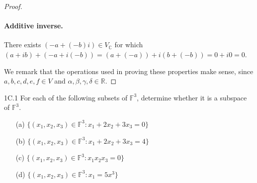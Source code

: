 \documentclass{exam}
\begin{document}
\begin{proof}
    \paragraph{Additive inverse.}
    \begin{center}
        There exists $(-a + (-b)i)\in V_{\mathbb C}$ for which $(a + ib) + (-a + i(-b)) = (a + (-a)) + i(b + (-b)) = 0 + i0 = 0.$
    \end{center}

    We remark that the operations used in proving these properties make sense, since $a, b, c, d, e, f\in V$ and $\alpha, \beta, \gamma, \delta \in \mathbb R$.
\end{proof}

\begin{problem}{1C.1}
    For each of the following subsets of $\mathbb F^3$, determine whether it is a subspace of $\mathbb F^3$.
    \begin{itemize}
        \item[(a)] $\{(x_1,x_2,x_3)\in\mathbb F^3:x_1 + 2x_2 + 3x_3 = 0\}$
        \item[(b)] $\{(x_1,x_2,x_3)\in\mathbb F^3:x_1 + 2x_2 + 3x_3 = 4\}$
        \item[(c)] $\{(x_1,x_2,x_3)\in\mathbb F^3:x_1x_2x_3 = 0\}$
        \item[(d)] $\{(x_1,x_2,x_3)\in\mathbb F^3:x_1 = 5x^3\}$
    \end{itemize}
\end{problem}
\end{document}
